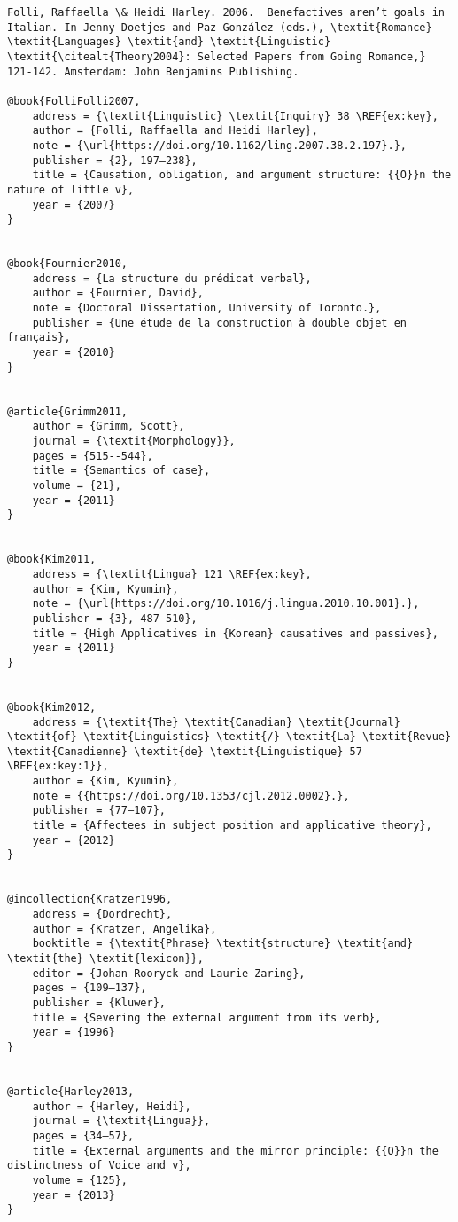 \documentclass[output=paper,modfonts,nonflat]{langsci/langscibook}
\begin{document}
\begin{verbatim}
Folli, Raffaella \& Heidi Harley. 2006.  Benefactives aren’t goals in Italian. In Jenny Doetjes and Paz González (eds.), \textit{Romance} \textit{Languages} \textit{and} \textit{Linguistic} \textit{\citealt{Theory2004}: Selected Papers from Going Romance,} 121-142. Amsterdam: John Benjamins Publishing.

@book{FolliFolli2007,
	address = {\textit{Linguistic} \textit{Inquiry} 38 \REF{ex:key},
	author = {Folli, Raffaella and Heidi Harley},
	note = {\url{https://doi.org/10.1162/ling.2007.38.2.197}.},
	publisher = {2}, 197–238},
	title = {Causation, obligation, and argument structure: {{O}}n the nature of little v},
	year = {2007}
}


@book{Fournier2010,
	address = {La structure du prédicat verbal},
	author = {Fournier, David},
	note = {Doctoral Dissertation, University of Toronto.},
	publisher = {Une étude de la construction à double objet en français},
	year = {2010}
}


@article{Grimm2011,
	author = {Grimm, Scott},
	journal = {\textit{Morphology}},
	pages = {515--544},
	title = {Semantics of case},
	volume = {21},
	year = {2011}
}


@book{Kim2011,
	address = {\textit{Lingua} 121 \REF{ex:key},
	author = {Kim, Kyumin},
	note = {\url{https://doi.org/10.1016/j.lingua.2010.10.001}.},
	publisher = {3}, 487–510},
	title = {High Applicatives in {Korean} causatives and passives},
	year = {2011}
}


@book{Kim2012,
	address = {\textit{The} \textit{Canadian} \textit{Journal} \textit{of} \textit{Linguistics} \textit{/} \textit{La} \textit{Revue} \textit{Canadienne} \textit{de} \textit{Linguistique} 57 \REF{ex:key:1}},
	author = {Kim, Kyumin},
	note = {{https://doi.org/10.1353/cjl.2012.0002}.},
	publisher = {77–107},
	title = {Affectees in subject position and applicative theory},
	year = {2012}
}


@incollection{Kratzer1996,
	address = {Dordrecht},
	author = {Kratzer, Angelika},
	booktitle = {\textit{Phrase} \textit{structure} \textit{and} \textit{the} \textit{lexicon}},
	editor = {Johan Rooryck and Laurie Zaring},
	pages = {109–137},
	publisher = {Kluwer},
	title = {Severing the external argument from its verb},
	year = {1996}
}


@article{Harley2013,
	author = {Harley, Heidi},
	journal = {\textit{Lingua}},
	pages = {34–57},
	title = {External arguments and the mirror principle: {{O}}n the distinctness of Voice and v},
	volume = {125},
	year = {2013}
}



\end{verbatim}
\end{document}
